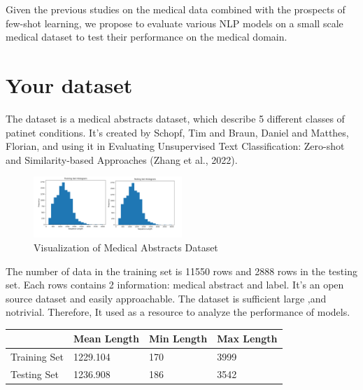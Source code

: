 \documentclass[11pt,a4paper]{article}
\begin{document}
\noindent Given the previous studies on the medical data combined with the prospects of few-shot learning, we propose to evaluate various NLP models on a small scale medical dataset to test their performance on the medical domain.



\section{Your dataset}
The dataset is a medical abstracts dataset, which
describe 5 different classes of patinet conditions.
It’s created by Schopf, Tim and Braun, Daniel
and Matthes, Florian, and using it in Evaluating
Unsupervised Text Classification: Zero-shot and
Similarity-based Approaches (Zhang et al., 2022).\\
\begin{figure}[ht]
    \centering
    \includegraphics[width=0.5\textwidth]{Data_set_an.png}
    \caption{Visualization of Medical Abstracts Dataset}
    \label{fig:example}
\end{figure}
\noindent The number of data in the training set is 11550
rows and 2888 rows in the testing set. Each rows
contains 2 information: medical abstract and label.
It’s an open source dataset and easily approachable. The dataset is sufficient large ,and
notrivial. Therefore, It used as a resource to analyze the performance of models.

\begin{table}[h]

\begin{tabular}{|l|l|l|l|}
\hline
                          & Mean Length & Min Length & Max Length \\ \hline
Training Set               & 1229.104                             & 170 &3999      \\ \hline
Testing Set                        & 1236.908                                & 186  &3542    \\ \hline

\end{tabular}

\end{table}
\end{document}
